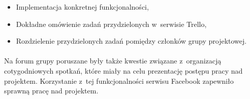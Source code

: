\begin{itemize}
\item Implementacja konkretnej funkcjonalności,
\item Dokładne omówienie zadań przydzielonych w~serwisie Trello,
\item Rozdzielenie przydzielonych zadań pomiędzy członków grupy projektowej.
\end{itemize}
\paragraph{}


Na forum grupy poruszane były także kwestie związane z~organizacją cotygodniowych spotkań, które miały na celu prezentację postępu pracy nad projektem. Korzystanie z~tej funkcjonalności serwisu Facebook zapewniło sprawną pracę nad projektem. 